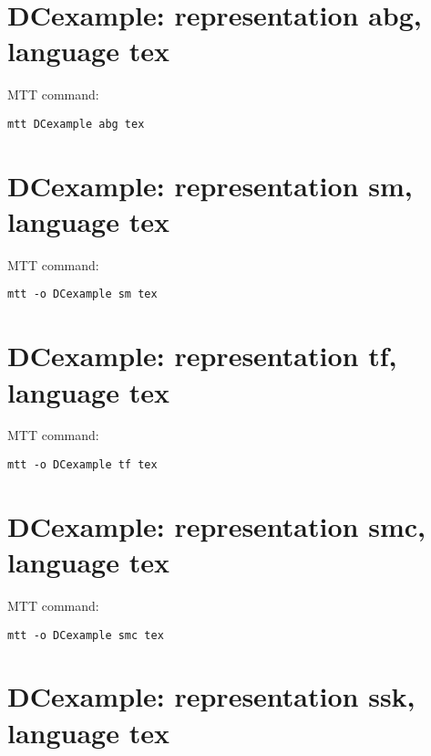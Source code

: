 

\section{\textbf{DCexample}: representation \textbf{abg}, language \textbf{tex}}
\label{sec:DCexample_abg.tex}


MTT command:
\begin{verbatim}
mtt DCexample abg tex 
\end{verbatim}
  


\section{\textbf{DCexample}: representation \textbf{sm}, language \textbf{tex}}
\label{sec:DCexample_sm.tex}


MTT command:
\begin{verbatim}
mtt -o DCexample sm tex 
\end{verbatim}
  


\section{\textbf{DCexample}: representation \textbf{tf}, language \textbf{tex}}
\label{sec:DCexample_tf.tex}


MTT command:
\begin{verbatim}
mtt -o DCexample tf tex 
\end{verbatim}
  


\section{\textbf{DCexample}: representation \textbf{smc}, language \textbf{tex}}
\label{sec:DCexample_smc.tex}


MTT command:
\begin{verbatim}
mtt -o DCexample smc tex 
\end{verbatim}
  


\section{\textbf{DCexample}: representation \textbf{ssk}, language \textbf{tex}}
\label{sec:DCexample_ssk.tex}


